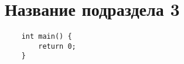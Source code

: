\section{Название подраздела 3}

\begin{verbatim}
    int main() {
        return 0;
    }
\end{verbatim}
\label{listing:code_example}